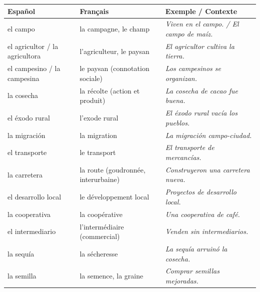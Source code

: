 \documentclass[11pt]{article}
\newcommand{\esp}[1]{\ifmmode\text{\textit{#1}}\else\begingroup\selectlanguage{spanish}\itshape #1\endgroup\fi}
\begin{document}
\begin{propriete}
\begin{center}
\begin{tabularx}{\linewidth}{|X|X|X|}
\hline
\rowcolor{popblueL} \textbf{Español} & \textbf{Français} & \textbf{Exemple / Contexte} \\
\hline
el campo & la campagne, le champ & \esp{Viven en el campo.} / \esp{El campo de maíz.} \\
\hline
el agricultor / la agricultora & l'agriculteur, le paysan & \esp{El agricultor cultiva la tierra.} \\
\hline
el campesino / la campesina & le paysan (connotation sociale) & \esp{Los campesinos se organizan.} \\
\hline
la cosecha & la récolte (action et produit) & \esp{La cosecha de cacao fue buena.} \\
\hline
el éxodo rural & l'exode rural & \esp{El éxodo rural vacía los pueblos.} \\
\hline
la migración & la migration & \esp{La migración campo-ciudad.} \\
\hline
el transporte & le transport & \esp{El transporte de mercancías.} \\
\hline
la carretera & la route (goudronnée, interurbaine) & \esp{Construyeron una carretera nueva.} \\
\hline
el desarrollo local & le développement local & \esp{Proyectos de desarrollo local.} \\
\hline
la cooperativa & la coopérative & \esp{Una cooperativa de café.} \\
\hline
el intermediario & l'intermédiaire (commercial) & \esp{Venden sin intermediarios.} \\
\hline
la sequía & la sécheresse & \esp{La sequía arruinó la cosecha.} \\
\hline
la semilla & la semence, la graine & \esp{Comprar semillas mejoradas.} \\
\hline
\end{tabularx}
\end{center}
\end{propriete}
\end{document}
